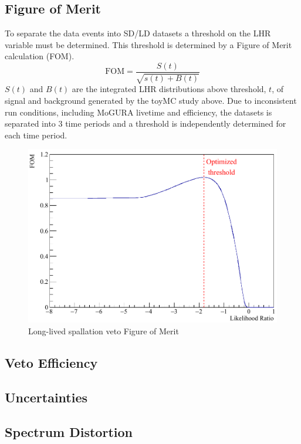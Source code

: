 \subsection*{Figure of Merit}
To separate the data events into SD/LD datasets a threshold on the LHR variable must be determined. This threshold is determined by a Figure of Merit calculation (FOM).
\begin{equation}
	\text{FOM}=\frac{S(t)}{\sqrt{s(t)+B(t)}}
\end{equation}
$S(t)$ and $B(t)$ are the integrated LHR distributions above threshold, $t$, of signal and background generated by the toyMC study above. Due to inconsistent run conditions, including MoGURA livetime and efficiency, the datasets is separated into 3 time periods and a threshold is independently determined for each time period.
\begin{figure}[htb]
	\centering
	\includegraphics[scale=0.35]{FOM.png}
	\caption{Long-lived spallation veto Figure of Merit}
	\label{fig:FOM}
\end{figure}

\subsection*{Veto Efficiency}
\subsection*{Uncertainties}
\subsection*{Spectrum Distortion}

